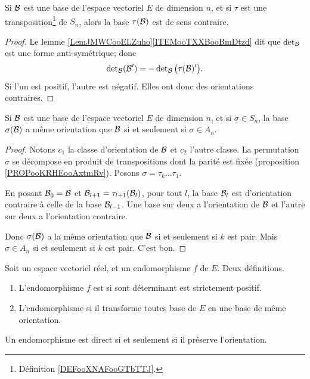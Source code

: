 \begin{proposition}
    Si \( \mathcal{B}\) est une base de l'espace vectoriel \( E\) de dimension \( n\), et si \( \tau\) est une transposition\footnote{Définition \ref{DEFooXNAFooGTbTTJ}.} de \( S_n\), alors la base \( \tau(\mathcal{B})\) est de sens contraire.
\end{proposition}

\begin{proof}
    Le lemme \ref{LemJMWCooELZuho}\ref{ITEMooTXXBooBmDtzd} dit que \( \mathop{\mathrm{det}}\nolimits_{\mathcal{B}}\) est une forme anti-symétrique; donc
    \begin{equation}
        \mathop{\mathrm{det}}\nolimits_{\mathcal{B}}(\mathcal{B}')=-\mathop{\mathrm{det}}\nolimits_{\mathcal{B}}\big( \tau(\mathcal{B})' \big).
    \end{equation}
    Si l'un est positif, l'autre est négatif. Elles ont donc des orientations contraires.
\end{proof}

\begin{corollary}
    Si \( \mathcal{B}\) est une base de l'espace vectoriel \( E\) de dimension \( n\), et si \( \sigma\in S_n\), la base \( \sigma(\mathcal{B})\) a même orientation que \( \mathcal{B}\) si et seulement si \( \sigma\in A_n\).
\end{corollary}

\begin{proof}
    Notons \( c_1\) la classe d'orientation de \( \mathcal{B}\) et \( c_2\) l'autre classe. La permutation \( \sigma\) se décompose en produit de transpositions dont la parité est fixée (proposition \ref{PROPooKRHEooAxtmRv}). Posons \( \sigma=\tau_k\ldots \tau_1\).

    En posant \( \mathcal{B}_0=\mathcal{B}\) et \( \mathcal{B}_{l+1}=\tau_{l+1}(\mathcal{B}_l)\), pour tout \( l\), la base \( \mathcal{B}_l\) est d'orientation contraire à celle de la base \( \mathcal{B}_{l-1}\). Une base sur deux a l'orientation de \( \mathcal{B}\) et l'autre sur deux a l'orientation contraire.

    Donc \( \sigma(\mathcal{B})\) a la même orientation que \( \mathcal{B}\) si et seulement si \( k\) est pair. Mais \( \sigma\in A_n\) si et seulement si \( k\) est pair. C'est bon.
\end{proof}

\begin{propositionDef}        \label{PROPooNBAXooKNUrnk}
    Soit un espace vectoriel réel, et un endomorphisme \( f\) de \( E\). Deux définitions.
    \begin{enumerate}
        \item       \label{ITEMooOAXFooLIPHlW}
            L'endomorphisme \( f\) est  si sont déterminant est strictement positif.
        \item       \label{ITEMooNKYCooXTgKJA}
            L'endomorphisme  si il transforme toutes base de \( E\) en une base de même orientation.
    \end{enumerate}
    Un endomorphisme est direct si et seulement si il préserve l'orientation.
\end{propositionDef}

